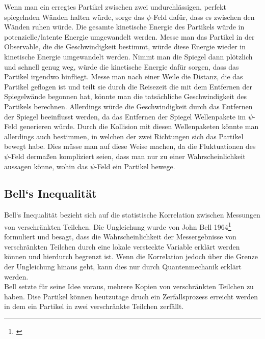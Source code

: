 Wenn man ein erregtes Partikel zwischen zwei undurchlässigen, perfekt spiegelnden Wänden halten würde, sorge das $\psi$-Feld dafür, dass es zwischen den Wänden ruhen würde. Die gesamte kinetische Energie des Partikels würde in potenzielle/latente Energie umgewandelt werden. Messe man das Partikel in der Observable, die die Geschwindigkeit bestimmt, würde diese Energie wieder in kinetische Energie umgewandelt werden. Nimmt man die Spiegel dann plötzlich und schnell genug weg, würde die kinetische Energie dafür sorgen, dass das Partikel irgendwo hinfliegt. Messe man nach einer Weile die Distanz, die das Partikel geflogen ist und teilt sie durch die Reisezeit die mit dem Entfernen der Spiegelwände begonnen hat, könnte man die tatsächliche Geschwindigkeit des Partikels berechnen. Allerdings würde die Geschwindigkeit durch das Entfernen der Spiegel beeinflusst werden, da das Entfernen der Spiegel Wellenpakete im $\psi$-Feld  generieren würde. Durch die Kollision mit diesen Wellenpaketen könnte man allerdings auch bestimmen, in welchen der zwei Richtungen sich das Partikel bewegt habe. Dies müsse man auf diese Weise machen, da die Fluktuationen des $\psi$-Feld dermaßen kompliziert seien, dass man nur zu einer Wahrscheinlichkeit aussagen könne, wohin das $\psi$-Feld ein Partikel bewege.


\subsection{Bell`s Inequalität}
\label{subsec:bells_inequality}
Bell`s Inequalität bezieht sich auf die statistische Korrelation zwischen Messungen von verschränkten Teilchen.
Die Ungleichung wurde von John Bell 1964\footnote{\cite{bell_einstein_1964}} formuliert und besagt, dass die Wahrscheinlichkeit der Messergebnisse von verschränkten Teilchen durch eine lokale versteckte Variable erklärt werden können und hierdurch begrenzt ist.
Wenn die Korrelation jedoch über die Grenze der Ungleichung hinaus geht, kann dies nur durch Quantenmechanik erklärt werden.\\

Bell setzte für seine Idee voraus, mehrere Kopien von verschränkten Teilchen zu haben. Dise Partikel können heutzutage druch ein Zerfallsprozess erreicht werden in dem ein Partikel in zwei verschränkte Teilchen zerfällt.\\

